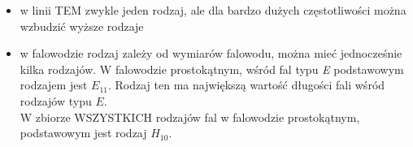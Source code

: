 \begin{solution}
\begin{itemize}
    \begin{itemize}
    \item w linii TEM zwykle jeden rodzaj, ale dla bardzo dużych częstotliwości można wzbudzić wyższe rodzaje
    \item w falowodzie  rodzaj zależy od wymiarów falowodu, można mieć jednocześnie kilka rodzajów. W falowodzie
            prostokątnym, wśród fal typu \textsl{E} podstawowym rodzajem jest $E_{11}$. Rodzaj ten ma największą
            wartość długości fali wśród rodzajów typu $E$.\\
            W zbiorze WSZYSTKICH rodzajów fal w falowodzie prostokątnym, podstawowym jest rodzaj $H_{10}$.    
    \end{itemize}
\end{itemize}

\end{solution}
